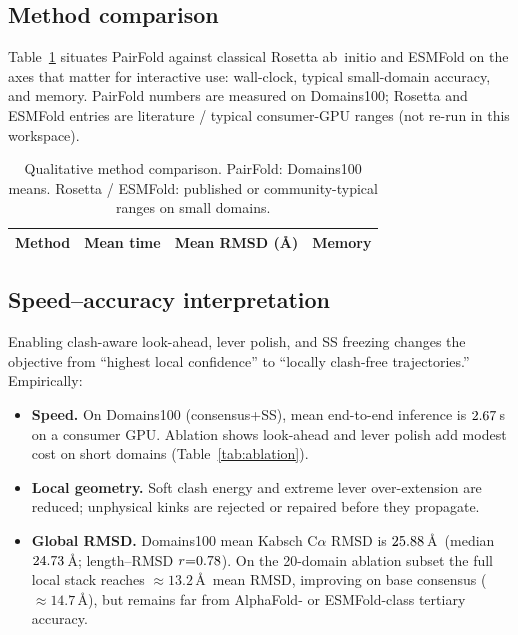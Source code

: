 \documentclass[11pt,a4paper]{article}
\begin{document}
\subsection{Method comparison}

Table~\ref{tab:methods} situates PairFold against classical Rosetta ab~initio and ESMFold on the axes that matter for interactive use: wall-clock, typical small-domain accuracy, and memory.
PairFold numbers are measured on Domains100; Rosetta and ESMFold entries are literature / typical consumer-GPU ranges (not re-run in this workspace).

\begin{table}[t]
  \centering
  \caption{Qualitative method comparison. PairFold: Domains100 means. Rosetta / ESMFold: published or community-typical ranges on small domains.}
  \label{tab:methods}
  \begin{tabular}{@{}lccc@{}}
    \toprule
    Method & Mean time & Mean RMSD (\AA) & Memory \\
    \midrule
    
    \bottomrule
  \end{tabular}
\end{table}

\subsection{Speed--accuracy interpretation}

Enabling clash-aware look-ahead, lever polish, and SS freezing changes the objective from ``highest local confidence'' to ``locally clash-free trajectories.''
Empirically:
\begin{itemize}[leftmargin=1.5em,itemsep=0.35em]
  \item \textbf{Speed.} On Domains100 (consensus+SS), mean end-to-end inference is $2.67{}$\,s on a consumer GPU. Ablation shows look-ahead and lever polish add modest cost on short domains (Table~\ref{tab:ablation}).
  \item \textbf{Local geometry.} Soft clash energy and extreme lever over-extension are reduced; unphysical kinks are rejected or repaired before they propagate.
  \item \textbf{Global RMSD.} Domains100 mean Kabsch C$\alpha$ RMSD is $25.88{}$\,\AA\ (median $24.73{}$\,\AA; length--RMSD $r{=}0.78{}$).
        On the 20-domain ablation subset the full local stack reaches $\approx 13.2$\,\AA\ mean RMSD, improving on base consensus ($\approx 14.7$\,\AA), but remains far from AlphaFold- or ESMFold-class tertiary accuracy.
\end{itemize}
\end{document}
